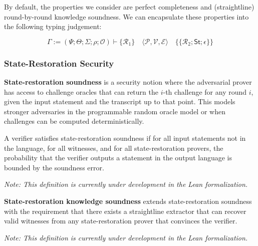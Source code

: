 By default, the properties we consider are perfect completeness and (straightline) round-by-round knowledge soundness. We can encapsulate these properties into the following typing judgement:

\[
    \Gamma := (\Psi; \Theta; \varSigma; \rho; \mathcal{O}) \vdash \{\mathcal{R}_1\} \quad \langle\mathcal{P}, \mathcal{V}, \mathcal{E}\rangle \quad \{\!\!\{\mathcal{R}_2; \mathsf{St}; \epsilon\}\!\!\}
\]

\subsubsection{State-Restoration Security}

\begin{definition}
    \label{def:sr_soundness}
    \textbf{State-restoration soundness} is a security notion where the adversarial prover has access to
    challenge oracles that can return the $i$-th challenge for any round $i$, given the input statement
    and the transcript up to that point. This models stronger adversaries in the programmable random
    oracle model or when challenges can be computed deterministically.

    A verifier satisfies state-restoration soundness if for all input statements not in the language,
    for all witnesses, and for all state-restoration provers, the probability that the verifier
    outputs a statement in the output language is bounded by the soundness error.

    \emph{Note: This definition is currently under development in the Lean formalization.}
\end{definition}

\begin{definition}
    \label{def:sr_knowledge_soundness}
    \textbf{State-restoration knowledge soundness} extends state-restoration soundness with the
    requirement that there exists a straightline extractor that can recover valid witnesses from
    any state-restoration prover that convinces the verifier.

    \emph{Note: This definition is currently under development in the Lean formalization.}
\end{definition}



